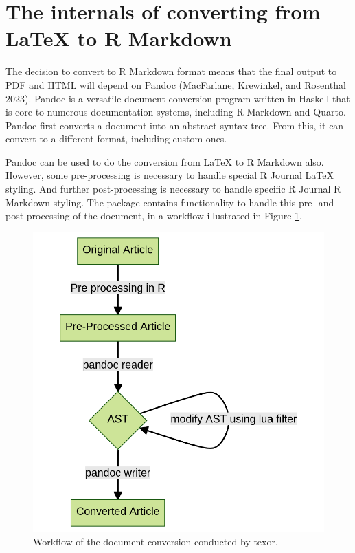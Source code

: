 \hypertarget{internals}{%
\section{The internals of converting from LaTeX to R Markdown}\label{internals}}

The decision to convert to R Markdown format means that the final output to PDF and HTML will depend on Pandoc (MacFarlane, Krewinkel, and Rosenthal 2023). Pandoc is a versatile document conversion program written in Haskell that is core to numerous documentation systems, including R Markdown and Quarto. Pandoc first converts a document into an abstract syntax tree. From this, it can convert to a different format, including custom ones.

Pandoc can be used to do the conversion from LaTeX to R Markdown also. However, some pre-processing is necessary to handle special R Journal LaTeX styling. And further post-processing is necessary to handle specific R Journal R Markdown styling. The  package contains functionality to handle this pre- and post-processing of the document, in a workflow illustrated in Figure \ref{fig:workflow}.

\begin{figure}

{\centering \includegraphics[width=0.9\linewidth]{workflow} 

}

\caption{Workflow of the document conversion conducted by texor.}\label{fig:workflow}
\end{figure}

